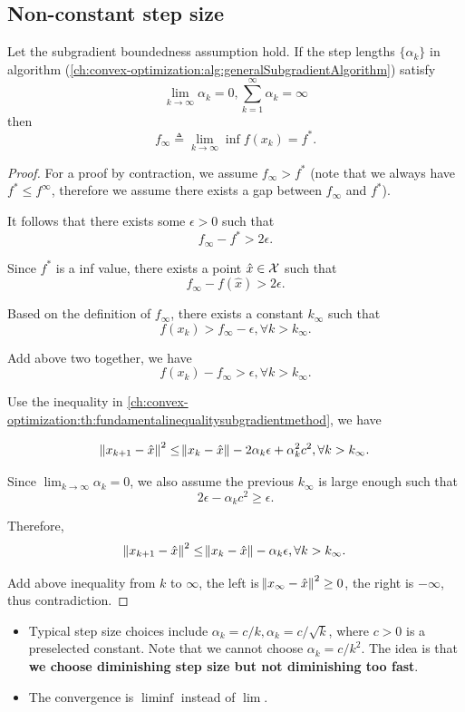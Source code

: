 \begin{refsection}
\subsection{Non-constant step size}\label{ch:convex-optimization:sec:subgradientNonConstantstepsize}
\begin{theorem}\cite[157]{bertsekas2015convex}
Let the subgradient boundedness assumption hold. If the step lengths $\{\alpha_k\}$ in algorithm (\autoref{ch:convex-optimization:alg:generalSubgradientAlgorithm}) satisfy
	$$\lim_{k\to \infty}\alpha_k = 0, \sum_{k=1}^\infty \alpha_k = \infty$$
then 
$$f_\infty \triangleq \lim_{k\to \infty}\inf f(x_k) = f^*.$$
\end{theorem}
\begin{proof}
For a proof by contraction, we assume $f_\infty > f^*$ (note that we always have $f^* \leq f^\infty$, therefore we assume there exists a gap between $f_\infty$ and $f^*$).

It follows that there exists some $\epsilon > 0$ such that 
$$f_\infty - f^* > 2\epsilon.$$

Since $f^*$ is a inf value, there exists a point $\hat{x} \in \mathcal{X}$ such that
$$f_\infty - f(\hat{x}) > 2\epsilon.$$

Based on the definition of $f_\infty$, there exists a constant $k_\infty$ such that
$$f(x_k) > f_\infty - \epsilon, \forall k > k_\infty.$$

Add above two together, we have
$$f(x_k) - f_\infty > \epsilon, \forall k > k_\infty.$$

Use the inequality in \autoref{ch:convex-optimization:th:fundamentalinequalitysubgradientmethod}, we have

$$\norm{x_{k+1} - \hat{x}}^2 \leq \norm{x_k - \hat{x}} - 2\alpha_k\epsilon + \alpha_k^2 c^2,\forall k > k_\infty.$$

Since $\lim_{k\to\infty} \alpha_k = 0$, we also assume the previous $k_\infty$ is large enough such that $$2\epsilon -\alpha_k c^2 \geq \epsilon.$$

Therefore, 
$$\norm{x_{k+1} - \hat{x}}^2 \leq \norm{x_k - \hat{x}} - \alpha_k\epsilon ,\forall k > k_\infty .$$

Add above inequality from $k$ to $\infty$, the left is $\norm{x_\infty - \hat{x}}^2 \geq 0$, the right is $-\infty$, thus contradiction.
\end{proof}


\begin{remark}\hfill
\begin{itemize}
	\item Typical step size choices include $\alpha_k = c/k, \alpha_k = c/\sqrt{k}$, where $c>0$ is a preselected constant. Note that we cannot choose $\alpha_k = c/k^2$. 
	The idea is that \textbf{we choose diminishing step size but not diminishing too fast}.
	\item The convergence is $\liminf$ instead of $\lim$.
\end{itemize}
\end{remark}



\end{refsection}
